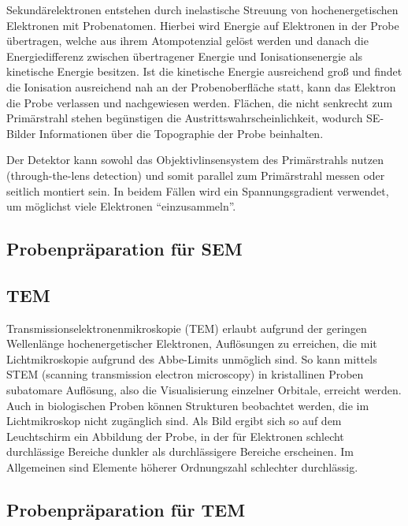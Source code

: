 Sekundärelektronen entstehen durch inelastische Streuung von hochenergetischen Elektronen mit Probenatomen.
Hierbei wird Energie auf Elektronen in der Probe übertragen, welche aus ihrem Atompotenzial gelöst werden und danach die Energiedifferenz zwischen übertragener Energie und Ionisationsenergie als kinetische Energie besitzen.
Ist die kinetische Energie ausreichend groß und findet die Ionisation ausreichend nah an der Probenoberfläche statt, kann das Elektron die Probe verlassen und nachgewiesen werden. %
Flächen, die nicht senkrecht zum Primärstrahl stehen begünstigen die Austrittswahrscheinlichkeit, wodurch SE-Bilder Informationen über die Topographie der Probe beinhalten.

Der Detektor kann sowohl das Objektivlinsensystem des Primärstrahls nutzen (through-the-lens detection) und somit parallel zum Primärstrahl messen oder seitlich montiert sein.
In beidem Fällen wird ein Spannungsgradient verwendet, um möglichst viele Elektronen \enquote{einzusammeln}.

\subsection{Probenpräparation für SEM}

\subsection{TEM}

Transmissionselektronenmikroskopie (TEM) erlaubt aufgrund der geringen Wellenlänge hochenergetischer Elektronen, Auflösungen zu erreichen, die mit Lichtmikroskopie aufgrund des Abbe-Limits unmöglich sind.
So kann mittels STEM (scanning transmission electron microscopy) in kristallinen Proben subatomare Auflösung, also die Visualisierung einzelner Orbitale, erreicht werden. %
Auch in biologischen Proben können Strukturen beobachtet werden, die im Lichtmikroskop nicht zugänglich sind. %
Als Bild ergibt sich so auf dem Leuchtschirm ein Abbildung der Probe, in der für Elektronen schlecht durchlässige Bereiche dunkler als durchlässigere Bereiche erscheinen.
Im Allgemeinen sind Elemente höherer Ordnungszahl schlechter durchlässig.

\subsection{Probenpräparation für TEM}

